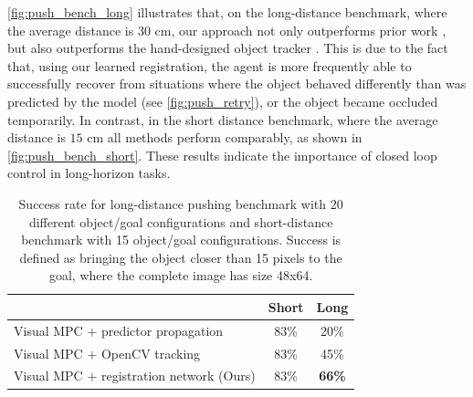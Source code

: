 \autoref{fig:push_bench_long} illustrates that, on the long-distance benchmark, where the average distance is $30$ cm,
our approach not only outperforms prior work \cite{sna}, but also outperforms the hand-designed object tracker \cite{babenko2009visual}. This is due to the fact that, using our learned registration, the agent is more frequently able to successfully recover from situations where the object behaved differently than was predicted by the model (see \autoref{fig:push_retry}), or the object became occluded temporarily. In contrast, in the short distance benchmark, where the average distance is $15$ cm
all methods perform comparably, as shown in \autoref{fig:push_bench_short}. These results indicate the importance of closed loop control in long-horizon tasks.

\begin{table}
	{\footnotesize
		\begin{center}
			\begin{tabular}{lcc}
				\toprule
				& Short & Long \\
				\midrule
			   Visual MPC $+$ predictor propagation  & 83\% & 20\% \\
  			   Visual MPC $+$ OpenCV tracking  & 83\%  & 45\% \\
			   Visual MPC $+$ registration network (Ours)  & 83\% & \textbf{66\%}  \\
				\bottomrule
			\end{tabular}
		\end{center}
	}
	\caption{\footnotesize Success rate for long-distance pushing benchmark with 20 different object/goal configurations and short-distance benchmark with 15 object/goal configurations. Success is defined as bringing the object closer than 15 pixels to the goal, where the complete image has size 48x64.}
	\label{table:res_longd}
	\vspace{-0.35in}
\end{table}

